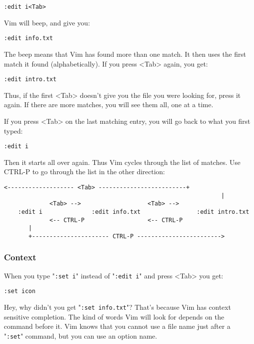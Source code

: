 \begin{Verbatim}[samepage=true]
 :edit i<Tab>
\end{Verbatim}

Vim will beep, and give you:

\begin{Verbatim}[samepage=true]
 :edit info.txt
\end{Verbatim}

The beep means that Vim has found more than one match.
It then uses the first match it found (alphabetically).
If you press <Tab> again, you get:

\begin{Verbatim}[samepage=true]
 :edit intro.txt
\end{Verbatim}

Thus, if the first <Tab> doesn't give you the file you were looking for, press it again.
If there are more matches, you will see them all, one at a time.

If you press <Tab> on the last matching entry, you will go back to what you first typed:

\begin{Verbatim}[samepage=true]
 :edit i
\end{Verbatim}

Then it starts all over again.
Thus Vim cycles through the list of matches.
Use CTRL-P to go through the list in the other direction:

\begin{Verbatim}[samepage=true]
          <------------------- <Tab> -------------------------+
                                                              |
             <Tab> -->                   <Tab> -->
    :edit i              :edit info.txt                :edit intro.txt
             <-- CTRL-P                  <-- CTRL-P
       |
       +---------------------- CTRL-P ------------------------>
\end{Verbatim}
\subsubsection{Context}
When you type "\texttt{:set i}" instead of "\texttt{:edit i}" and press <Tab> you get:

\begin{Verbatim}[samepage=true]
 :set icon
\end{Verbatim}

Hey, why didn't you get "\texttt{:set info.txt}"?
That's because Vim has context sensitive completion.
The kind of words Vim will look for depends on the command before it.
Vim knows that you cannot use a file name just after a "\texttt{:set}" command, but you can use an option name.

